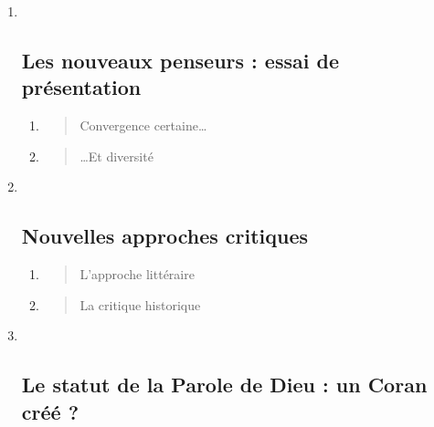 \begin{enumerate}
\def\labelenumi{\Roman{enumi}.}
\item ~
  \hypertarget{les-nouveaux-penseurs-essai-de-pruxe9sentation}{%
  \subsection{\texorpdfstring{ {Les nouveaux penseurs : essai
  de
  présentation}}{ Les nouveaux penseurs : essai de présentation}}\label{les-nouveaux-penseurs-essai-de-pruxe9sentation}}

  \begin{enumerate}
  \def\labelenumii{\arabic{enumii}.}
  \item
    \begin{quote}
    Convergence certaine\ldots{}
    \end{quote}
  \item
    \begin{quote}
    \ldots Et diversité
    \end{quote}
  \end{enumerate}
\item ~
  \hypertarget{nouvelles-approches-critiques}{%
  \subsection{\texorpdfstring{ {Nouvelles approches
  critiques}}{ Nouvelles approches critiques}}\label{nouvelles-approches-critiques}}

  \begin{enumerate}
  \def\labelenumii{\arabic{enumii}.}
  \item
    \begin{quote}
    L'approche littéraire
    \end{quote}
  \item
    \begin{quote}
    La critique historique
    \end{quote}
  \end{enumerate}
\item ~
  \hypertarget{le-statut-de-la-parole-de-dieu-un-coran-cruxe9uxe9}{%
  \subsection{\texorpdfstring{{Le statut de la Parole de Dieu
  : un Coran créé
  ?}}{Le statut de la Parole de Dieu : un Coran créé ?}}\label{le-statut-de-la-parole-de-dieu-un-coran-cruxe9uxe9}}


\end{enumerate}

